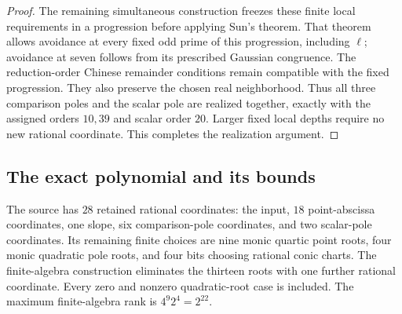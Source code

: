 \documentclass[11pt,a4paper]{article}
\theoremstyle{definition}
\theoremstyle{remark}
\begin{document}
\begin{proof}
The remaining simultaneous construction freezes these finite local
requirements in a progression before applying Sun's theorem. That
theorem allows avoidance at every fixed odd prime of this progression,
including $\ell$; avoidance at seven follows from its prescribed
Gaussian congruence. The reduction-order Chinese remainder conditions
remain compatible with the fixed progression. They also preserve the
chosen real neighborhood. Thus all three comparison poles and the
scalar pole are realized together, exactly with the assigned orders
$10,39$ and scalar order $20$. Larger fixed local depths require no new
rational coordinate. This completes the realization argument.
\end{proof}

\subsection{The exact polynomial and its bounds}

The source has $28$ retained rational coordinates: the input, $18$
point-abscissa coordinates, one slope, six comparison-pole coordinates,
and two scalar-pole coordinates. Its remaining finite choices are nine
monic quartic point roots, four monic quadratic pole roots, and four
bits choosing rational conic charts. The finite-algebra construction
eliminates the thirteen roots with one further rational coordinate.
Every zero and nonzero quadratic-root case is included. The maximum
finite-algebra rank is $4^9 2^4=2^{22}$.
\end{document}
